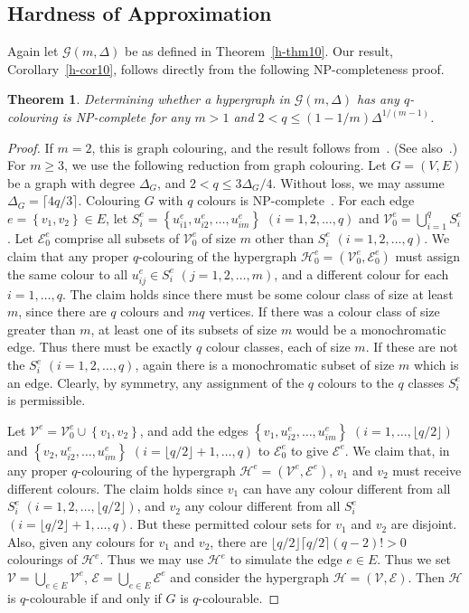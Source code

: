 \documentclass[11pt]{article}
\newtheorem{thm}{Theorem}[section]
\theoremstyle{definition}
\theoremstyle{remark}
\newcommand{\set}[1]{\left\{#1\right\}}
\newcommand{\CE}{\mathcal{E}}
\newcommand{\CG}{\mathcal{G}}
\newcommand{\CH}{\mathcal{H}}
\newcommand{\CV}{\mathcal{V}}
\begin{document}
\subsection{Hardness of Approximation}
Again let $\CG(m,\Delta)$ be as defined in Theorem~\ref{h-thm10}. Our
result, Corollary~\ref{h-cor10}, follows directly from the following
NP-completeness proof.
\begin{thm}\label{h-thm50}
Determining whether a hypergraph in $\CG(m,\Delta)$ has any $q$-colouring
is NP-complete for any $m > 1$ and $2 < q \leq(1-1/m)\Delta^{1/(m-1)}$.
\end{thm}
\begin{proof}

If $m=2$, this is graph colouring, and the result follows
from~\cite[Theorem 1.4]{EHK98}. (See also~\cite{MR01}.) For $m\geq 3$, we
use the following reduction from graph colouring. Let $G=(V,E)$ be a graph
with degree $\Delta_G$, and $2 < q \leq 3\Delta_G/4$. Without loss, we may assume
$\Delta_G= \lceil 4q/3\rceil$. Colouring $G$ with $q$ colours is
NP-complete~\cite{EHK98}. For each edge $e=\set{v_1,v_2}\in E$, let
$S_i^e=\set{u^e_{i1},u^e_{i2},\ldots,u^e_{im}}$ $(i=1,2,\ldots,q)$ and
$\CV_0^e=\bigcup_{i=1}^q S_i^e$. Let $\CE_0^e$ comprise all subsets of
$\CV_0^e$ of size $m$ other than $S_i^e$ $(i=1,2,\ldots,q)$. We claim that
any proper $q$-colouring of the hypergraph $\CH_0^e=(\CV_0^e,\CE_0^e)$ must
assign the same colour to all $u^e_{ij}\in S_i^e$ $(j=1,2,\ldots,m)$, and a
different colour for each $i=1,\ldots,q$. The claim holds since there must
be some colour class of size at least $m$, since there are $q$ colours and
$mq$ vertices. If there was a colour class of size greater than $m$, at
least one of its subsets of size $m$ would be a monochromatic edge. Thus
there must be exactly $q$ colour classes, each of size $m$. If these are
not the $S_i^e$ $(i=1,2,\ldots,q)$, again there is a monochromatic subset
of size $m$ which is an edge. Clearly, by symmetry, any assignment of the
$q$ colours to the $q$ classes $S_i^e$ is permissible.

Let $\CV^e=\CV_0^e\cup\set{v_1,v_2}$, and add the edges
$\set{v_1,u^e_{i2},\ldots,u^e_{im}}$ $(i=1,\ldots,\lfloor q/2\rfloor)$ and
$\set{v_2,u^e_{i2},\ldots,u^e_{im}}$ $(i=\lfloor q/2\rfloor+1,\ldots,q)$ to
$\CE_0^e$ to give $\CE^e$. We claim that, in any proper $q$-colouring of
the hypergraph $\CH^e=(\CV^e,\CE^e)$, $v_1$ and $v_2$ must receive
different colours. The claim holds since $v_1$ can have any colour
different from all $S_i^e$ $(i=1,2,\ldots,\lfloor q/2\rfloor)$, and $v_2$
any colour different from all $S_i^e$ $(i=\lfloor q/2\rfloor+1,\ldots,q)$.
But these permitted colour sets for $v_1$ and $v_2$ are disjoint. Also,
given any colours for $v_1$ and $v_2$, there are $\lfloor q/2\rfloor\lceil
q/2\rceil(q-2)!>0$ colourings of $\CH^e$. Thus we may use $\CH^e$ to
simulate the edge $e\in E$. Thus we set $\CV= \bigcup_{e\in E}\CV^e$,
$\CE=\bigcup_{e\in E}\CE^e$ and consider the hypergraph $\CH=(\CV,\CE)$.
Then $\CH$ is $q$-colourable if and only if $G$ is $q$-colourable.


\end{proof}
\end{document}
